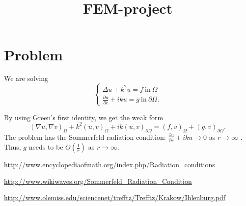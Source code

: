 \documentclass[a4paper,12pt]{article}
\begin{document}
\title{FEM-project}
\author{}
\date{}
\maketitle
\section*{Problem}
We are solving \[ \begin{cases}
\Delta u + k^2 u = f \ \mathrm{in} \ \Omega \\ \frac{\partial u}{\partial \bar{r}} + iku = g \ \mathrm{in} \ \partial \Omega.
\end{cases} \]

By using Green's first identity, we get the weak form \begin{equation*}
(\nabla u, \nabla v)_{\Omega} + k^2(u, v)_{\Omega} + ik(u, v)_{\partial \Omega} = (f, v)_{\Omega} + (g, v)_{\partial \Omega}.
\end{equation*} The problem has the Sommerfeld radiation condition: $\frac{\partial u}{\partial \bar{r}} + iku \rightarrow 0$ as $r \rightarrow \infty$ \cite{eom} \cite{wikiwaves}. Thus, $g$ needs to be $O(\frac{1}{r})$ as $r \rightarrow \infty$.

\begin{thebibliography}{9}

\url{http://www.encyclopediaofmath.org/index.php/Radiation_conditions}

\url{http://www.wikiwaves.org/Sommerfeld_Radiation_Condition}

\url{http://www.olemiss.edu/sciencenet/trefftz/Trefftz/Krakow/Ihlenburg.pdf}

\end{thebibliography}
\end{document}
